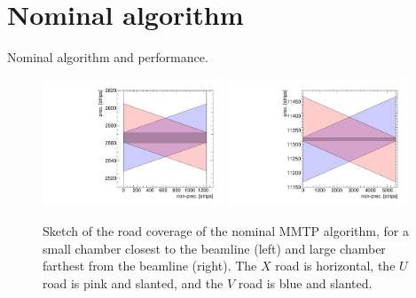 \section{Nominal algorithm}
\label{sec:nominal}

Nominal algorithm and performance.

\begin{figure}[!htpb]
  \begin{center}
    \includegraphics[width=0.48\textwidth]{figures/cartoon_roads_small_nominal.pdf}
    \includegraphics[width=0.48\textwidth]{figures/cartoon_roads_large_nominal.pdf}
  \end{center}
  \vspace{-10pt}
  \caption{Sketch of the road coverage of the nominal MMTP algorithm, for a small chamber closest to the beamline (left) and large chamber farthest from the beamline (right). The $X$ road is horizontal, the $U$ road is pink and slanted, and the $V$ road is blue and slanted.}
  \label{fig:cartoon_nominal}
\end{figure}

